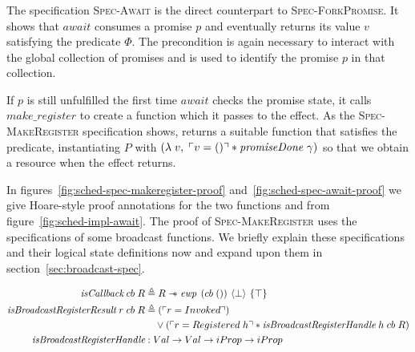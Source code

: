 \subsubsection{}
\label{sec:sched-spec-await}

The specification \textsc{Spec-Await} is the direct counterpart to \textsc{Spec-ForkPromise}.
It shows that \(await\) consumes a promise \(p\) and eventually returns its value \(v\) satisfying the predicate \(\Phi\).
The precondition \gsPInv{} is again necessary to interact with the global collection of promises and \gsIsPr{} is used to identify the promise \(p\) in that collection.

If \(p\) is still unfulfilled the first time \(await\) checks the promise state, it calls \(make\_register\) to create a  function which it passes to the \esuspend{} effect.
As the \textsc{Spec-MakeRegister} specification shows,  returns a suitable function that satisfies the \gsIsReg{} predicate, instantiating \(P\) with \((\lambda\; v,\; \ulcorner v = () \urcorner \ast \emph{promiseDone}~\gamma{})\) so that we obtain a \gspdone{} resource when the effect returns.


In figures~\ref{fig:sched-spec-makeregister-proof} and~\ref{fig:sched-spec-await-proof} we give Hoare-style proof annotations for the two functions  and  from figure~\ref{fig:sched-impl-await}.
The proof of \textsc{Spec-MakeRegister} uses the specifications of some broadcast functions.
We briefly explain these specifications and their logical state definitions now and expand upon them in section~\ref{sec:broadcast-spec}.

\begin{align*}
  \gsIsCb{}\; cb\; R                            & \triangleq R \wand \ewp{cb\; ()}{\bot}{\top}                                                           \\
  \emph{isBroadcastRegisterResult}\; r\; cb\; R & \triangleq (\ulcorner r = Invoked \urcorner)                                                           \\
                                                & \quad \vee (\ulcorner r = Registered\; h \urcorner \ast \emph{isBroadcastRegisterHandle}\; h\; cb\; R) \\
  \emph{isBroadcastRegisterHandle}              & : Val \to Val \to iProp \to iProp
\end{align*}

